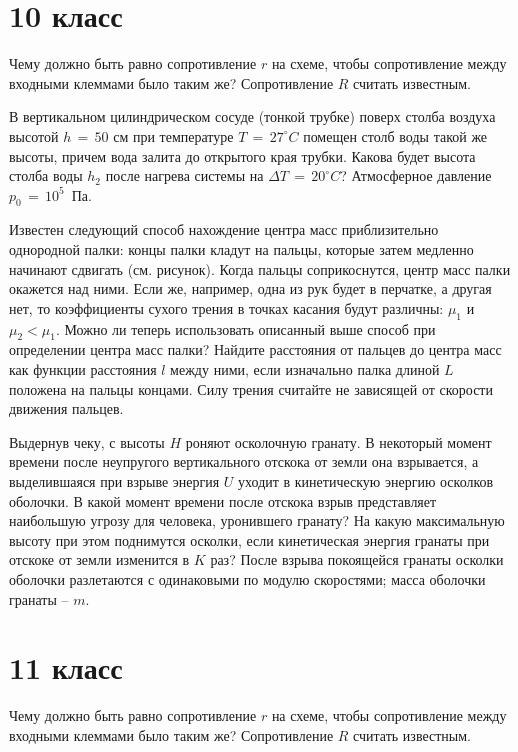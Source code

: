 \section{10 класс}

\AddProb Чему должно быть равно сопротивление $r$ на схеме, чтобы сопротивление между входными клеммами было таким же? Сопротивление $R$ считать известным.

\AddProb В вертикальном цилиндрическом сосуде (тонкой трубке) поверх столба воздуха высотой $h\,=\,50$ см при температуре $T\,=\,27^{\circ}C$ 
помещен столб воды такой же высоты, причем вода залита до открытого края трубки. Какова будет высота столба воды $h_2$ после нагрева системы на 
$\Delta T\,=\,20^{\circ}C$? Атмосферное давление $p_0\,=\,10^5$~Па.

\AddProb Известен следующий способ нахождение центра масс приблизительно однородной палки: концы палки кладут на пальцы, 
которые затем медленно начинают сдвигать (см. рисунок). Когда пальцы соприкоснутся, центр масс палки окажется над ними. Если же, например, 
одна из рук будет в перчатке, а другая нет, то коэффициенты сухого трения в точках касания будут различны: $\mu_1$ и $\mu_2<\mu_1$. 
Можно ли теперь использовать описанный выше способ при определении центра масс палки? Найдите расстояния от пальцев до центра масс как функции 
расстояния $l$ между ними, если изначально палка длиной $L$ положена на пальцы концами. Силу трения считайте не зависящей от скорости движения пальцев.

\AddProb Выдернув чеку, с высоты $H$ роняют осколочную гранату. В некоторый момент времени после неупругого вертикального отскока от земли она взрывается, 
а выделившаяся при взрыве энергия $U$ уходит в кинетическую энергию осколков оболочки. В какой момент времени после отскока взрыв представляет 
наибольшую угрозу для человека, уронившего гранату? На какую максимальную высоту при этом поднимутся осколки, если кинетическая энергия гранаты 
при отскоке от земли изменится в $K$ раз? После взрыва покоящейся гранаты осколки оболочки разлетаются с одинаковыми по модулю скоростями; 
масса оболочки гранаты -- $m$.



\section{11 класс}

\AddProb Чему должно быть равно сопротивление $r$ на схеме, чтобы сопротивление между входными клеммами было таким же? Сопротивление $R$ считать известным.

